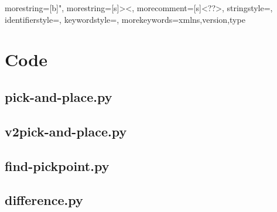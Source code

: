 


{
  morestring=[b]",
  morestring=[s]{>}{<},
  morecomment=[s]{<?}{?>},
  stringstyle=\color{black},
  identifierstyle=\color{darkblue},
  keywordstyle=\color{cyan},
  morekeywords={xmlns,version,type}%
}
\appendix



\chapter{Code}
\section{pick-and-place.py}\label{sec:pickandplace}
\section{v2pick-and-place.py}\label{sec:v2pickandplace}
%
\pagebreak
\section{find-pickpoint.py}\label{sec:findpickpoint}
%
\pagebreak
\section{difference.py}\label{sec:difference}
%
\pagebreak
